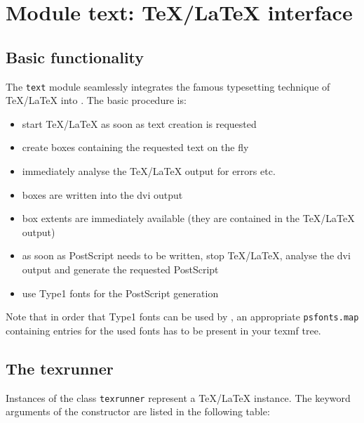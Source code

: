 \chapter{Module text: \TeX/\LaTeX{} interface}
\label{module:text}

\section{Basic functionality}

The \verb|text| module seamlessly integrates the famous typesetting
technique of \TeX/\LaTeX{} into \PyX. The basic procedure is:
\begin{itemize}
\item start \TeX/\LaTeX{} as soon as text creation is requested
\item create boxes containing the requested text on the fly
\item immediately analyse the \TeX/\LaTeX{} output for errors etc.
\item boxes are written into the dvi output
\item box extents are immediately available (they are contained in the
\TeX/\LaTeX{} output)
\item as soon as PostScript needs to be written, stop \TeX/\LaTeX{},
analyse the dvi output and generate the requested PostScript
\item use Type1 fonts for the PostScript generation 
\end{itemize}

Note that in order that Type1 fonts can be used by \PyX, an
appropriate \verb|psfonts.map| containing entries for the used fonts
has to be present in your texmf tree.

\section{The texrunner}
Instances of the class \verb|texrunner| represent a \TeX/\LaTeX{}
instance. The keyword arguments of the constructor are listed in the
following table:

